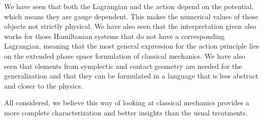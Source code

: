 \documentclass[10pt,twocolumn, nofootinbib]{revtex4-2}
\begin{document}
We have seen that both the Lagrangian and the action depend on the potential, which means they are gauge dependent. This makes the numerical values of those objects not strictly physical. We have also seen that the interpretation given also works for those Hamiltonian systems that do not have a corresponding Lagrangian, meaning that the most general expression for the action principle lies on the extended phase space formulation of classical mechanics. We have also seen that elements from symplectic and contact geometry are needed for the generalization and that they can be formulated in a language that is less abstract and closer to the physics.

All considered, we believe this way of looking at classical mechanics provides a more complete characterization and better insights than the usual treatments.


\end{document}
